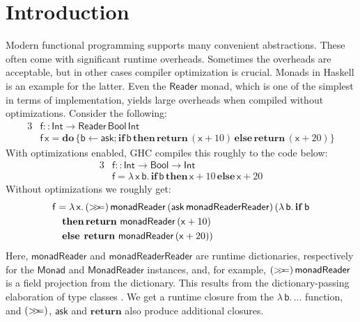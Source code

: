 \documentclass[acmsmall,screen]{acmart}
\newcommand{\msf}[1]{{\mathsf{#1}}}
\newcommand{\mbf}[1]{{\mathbf{#1}}}
\newcommand{\mdo}{\mbf{do}\,}
\newcommand{\ind}{\hspace{1em}}
\newcommand{\bif}{\mbf{if}\,}
\newcommand{\bthen}{\mbf{then}\,}
\newcommand{\belse}{\mbf{else}\,}
\newcommand{\return}{\mbf{return}\,}
\newcommand{\lam}{\lambda\,}
\newcommand{\vb}{\mathsf{b}}
\newcommand{\vx}{\mathsf{x}}
\newcommand{\vf}{\mathsf{f}}
\newcommand{\Int}{\msf{Int}}
\newcommand{\Reader}{\msf{Reader}}
\newcommand{\Bool}{\msf{Bool}}
\newcommand{\fro}{\leftarrow}
\newcommand{\bind}{\mathbin{>\!\!>\mkern-6.7mu=}}
\theoremstyle{remark}
\begin{document}


\maketitle


\section{Introduction}\label{sec:introduction}

Modern functional programming supports many convenient abstractions. These often
come with significant runtime overheads. Sometimes the overheads are acceptable,
but in other cases compiler optimization is crucial. Monads in Haskell is an
example for the latter. Even the $\Reader$ monad, which is one of the simplest
in terms of implementation, yields large overheads when compiled without
optimizations. Consider the following:
\begin{alignat*}{3}
  &\vf :: \Int \to \Reader\,\Bool\,\Int \\
  &\vf\,\vx = \mdo\{\vb \fro \msf{ask}; \bif \vb\, \bthen \return (\vx + 10)\, \belse \return (\vx + 20)\}
\end{alignat*}
With optimizations enabled, GHC compiles this roughly to the code below:
\begin{alignat*}{3}
  &\vf :: \Int \to \Bool \to \Int \\
  &\vf = \lam \vx\,\vb.\, \bif \vb\, \bthen \vx + 10\, \belse \vx + 20
\end{alignat*}
Without optimizations we roughly get:
\begin{alignat*}{3}
  &\vf = \lam \vx.\,(\bind)\,\msf{monadReader}\,(\msf{ask}\,\msf{monadReaderReader})\,(\lam \vb.\,\bif \vb\\
  &\ind \bthen\return\,\msf{monadReader}\,(\vx + 10)\\
  &\ind \belse\hspace{0.25em}\return\,\msf{monadReader}\,(\vx + 20))
\end{alignat*}
Here, $\msf{monadReader}$ and $\msf{monadReaderReader}$ are runtime
dictionaries, respectively for the $\msf{Monad}$ and $\msf{MonadReader}$
instances, and, for example, $(\bind)\,\msf{monadReader}$ is a field projection
from the dictionary. This results from the dictionary-passing elaboration of
type classes \cite{DBLP:conf/popl/WadlerB89}. We get a runtime closure from the
$\lam \vb.\,...$ function, and $(\bind)$, $\msf{ask}$ and $\mbf{return}$ also
produce additional closures.
\end{document}
